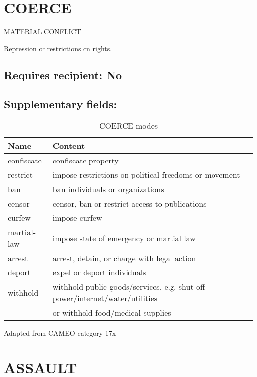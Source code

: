 \documentclass[11pt]{report}
\begin{document}
\newpage  

\section{COERCE}

\textsf{MATERIAL CONFLICT} \vspace{8pt}

Repression or restrictions on rights.

\subsection{Requires recipient: No}

\subsection{Supplementary fields: }

\begin{table}[htp]
\caption{COERCE modes}
\begin{center}
\begin{tabular}{|l|l|}
\hline
Name & Content \\
\hline
confiscate & confiscate property \\
restrict & impose restrictions on political freedoms or movement \\
ban & ban individuals or organizations \\
censor & censor, ban or restrict access to publications  \\
curfew & impose curfew \\
martial-law & impose state of emergency or martial law \\
arrest & arrest, detain, or charge with legal action \\
deport & expel or deport individuals \\
withhold & withhold public goods/services, e.g. shut off power/internet/water/utilities \\&or withhold food/medical supplies \\
\hline
\end{tabular}
\end{center}
\label{tab:coerce}
Adapted from CAMEO category 17x
\end{table}%

\newpage  


\section{ASSAULT}
\end{document}
